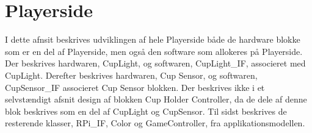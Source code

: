 \documentclass[Rapport/Rapport_main.tex]{subfiles}
\begin{document}
\section{Playerside}
I dette afnsit beskrives udviklingen af hele Playerside både de hardware blokke som er en del af Playerside, men også den software som allokeres på Playerside. Der beskrives hardwaren, CupLight, og softwaren, CupLight\_IF, associeret med CupLight. Derefter beskrives hardwaren, Cup Sensor, og softwaren, CupSensor\_IF associeret Cup Sensor blokken. Der beskrives ikke i et selvstændigt afsnit design af blokken Cup Holder Controller, da de dele af denne blok beskrives som en del af CupLight og CupSensor.
Til sidst beskrives de resterende klasser, RPi\_IF, Color og GameController, fra applikationsmodellen.




\end{document}
